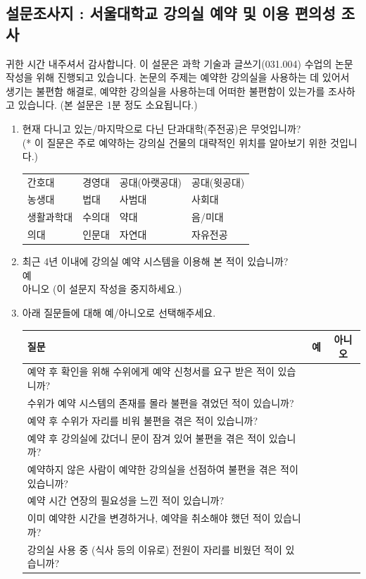 \documentclass[11pt,a4paper]{article}
\begin{document}
\subsection{설문조사지 : 서울대학교 강의실 예약 및 이용 편의성 조사}
귀한 시간 내주셔서 감사합니다. 이 설문은 과학 기술과 글쓰기(031.004) 수업의 논문 작성을 위해 진행되고 있습니다. 논문의 주제는 예약한 강의실을 사용하는 데 있어서 생기는 불편함 해결로, 예약한 강의실을 사용하는데 어떠한 불편함이 있는가를 조사하고 있습니다. (본 설문은 1분 정도 소요됩니다.)
\begin{enumerate}
\item 현재 다니고 있는/마지막으로 다닌 단과대학(주전공)은 무엇입니까?\\
(* 이 질문은 주로 예약하는 강의실 건물의 대략적인 위치를 알아보기 위한 것입니다.)\\
\begin{tabular}{ l l l l }
간호대 & 경영대 & 공대(아랫공대) & 공대(윗공대)\\
농생대 & 법대 & 사범대 & 사회대\\
생활과학대 & 수의대 & 약대 & 음/미대\\
의대 & 인문대 & 자연대 & 자유전공
\end{tabular}
\item 최근 4년 이내에 강의실 예약 시스템을 이용해 본 적이 있습니까?\\
예\\
아니오 (이 설문지 작성을 중지하세요.)
\item 아래 질문들에 대해 예/아니오로 선택해주세요.\\
\begin{tabular}{ | l | c | c | }
\hline
질문 & 예 & 아니오 \\
\hline
예약 후 확인을 위해 수위에게 예약 신청서를 요구 받은 적이 있습니까? & & \\
\hline
수위가 예약 시스템의 존재를 몰라 불편을 겪었던 적이 있습니까? & & \\
\hline
예약 후 수위가 자리를 비워 불편을 겪은 적이 있습니까? & & \\
\hline
예약 후 강의실에 갔더니 문이 잠겨 있어 불편을 겪은 적이 있습니까? & & \\
\hline
예약하지 않은 사람이 예약한 강의실을 선점하여 불편을 겪은 적이 있습니까? & & \\
\hline
예약 시간 연장의 필요성을 느낀 적이 있습니까? & & \\
\hline
이미 예약한 시간을 변경하거나, 예약을 취소해야 했던 적이 있습니까? & & \\
\hline
강의실 사용 중 (식사 등의 이유로) 전원이 자리를 비웠던 적이 있습니까? & & \\

\end{tabular}
\end{enumerate}
\end{document}
